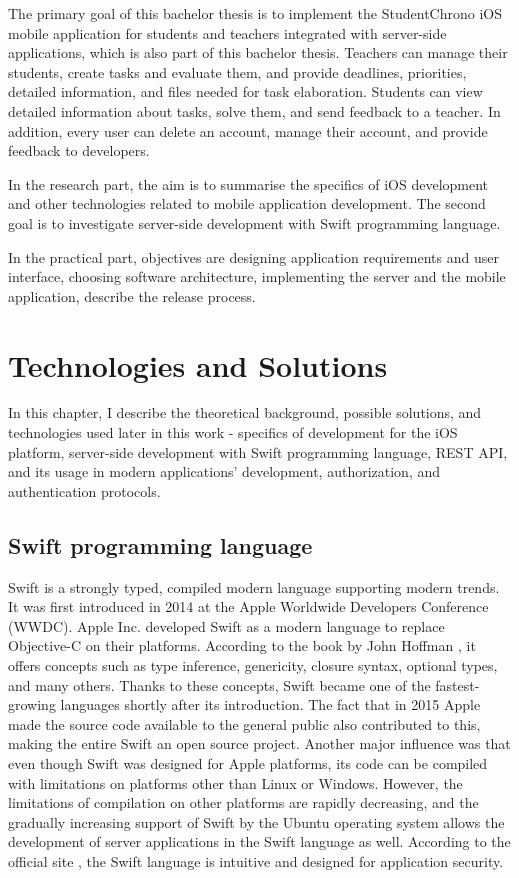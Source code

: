 \documentclass[
  biblatex,
  language=english,
  figures=false,
  sourcecodes,
  glossaries,
  index
]{kidiplom}
\begin{document}
The primary goal of this bachelor thesis is to implement the StudentChrono iOS mobile application for students and teachers integrated with server-side applications, which is also part of this bachelor thesis. Teachers can manage their students, create tasks and evaluate them, and provide deadlines, priorities, detailed information, and files needed for task elaboration. Students can view detailed information about tasks, solve them, and send feedback to a teacher. In addition, every user can delete an account, manage their account, and provide feedback to developers.

In the research part, the aim is to summarise the specifics of iOS development and other technologies related to mobile application development. The second goal is to investigate server-side development with Swift programming language.

In the practical part, objectives are designing application requirements and user interface, choosing software architecture, implementing the server and the mobile application, describe the release process.

\section{Technologies and Solutions}

In this chapter, I describe the theoretical background, possible solutions, and technologies used later in this work - specifics of development for the iOS platform, server-side development with Swift programming language, REST API, and its usage in modern applications' development, authorization, and authentication protocols.

\subsection{Swift programming language}
Swift is a strongly typed, compiled modern language supporting modern trends. It was first introduced in 2014 at the Apple Worldwide Developers Conference (WWDC). Apple Inc. developed Swift as a modern language to replace Objective-C on their platforms. According to the book by John Hoffman \cite{bib2}, it offers concepts such as type inference, genericity, closure syntax, optional types, and many others. Thanks to these concepts, Swift became one of the fastest-growing languages shortly after its introduction. The fact that in 2015 Apple made the source code available to the general public also contributed to this, making the entire Swift an open source project. Another major influence was that even though Swift was designed for Apple platforms, its code can be compiled with limitations on platforms other than Linux or Windows. However, the limitations of compilation on other platforms are rapidly decreasing, and the gradually increasing support of Swift by the Ubuntu operating system allows the development of server applications in the Swift language as well. According to the official site \cite{bib3}, the Swift language is intuitive and designed for application security.
\end{document}
